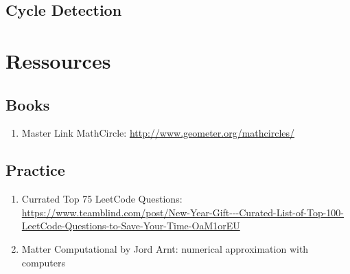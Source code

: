\documentclass{article}
\begin{document}
\subsection{Cycle Detection}%
\label{sub:Cycle Detection}

\section*{Ressources}%
\label{sec:Ressources}

\subsection{Books}%
\label{sub:Books}

\begin{enumerate}
    \item Master Link MathCircle: \url{http://www.geometer.org/mathcircles/}
\end{enumerate}

\subsection{Practice}%
\label{sub:Practice}

\begin{enumerate}
    \item Currated Top 75 LeetCode Questions: \url{https://www.teamblind.com/post/New-Year-Gift---Curated-List-of-Top-100-LeetCode-Questions-to-Save-Your-Time-OaM1orEU}
    \item Matter Computational by Jord Arnt: numerical approximation with
	computers
\end{enumerate}
\end{document}

